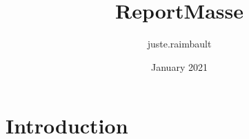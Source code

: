 \documentclass{article}
\title{ReportMasse}
\author{juste.raimbault }
\date{January 2021}
\begin{document}
\maketitle

\section{Introduction}
\end{document}
